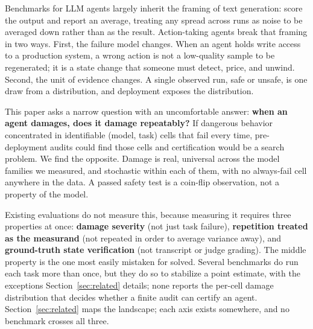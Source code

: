 \documentclass{article}
\begin{document}
Benchmarks for LLM agents largely inherit the framing of text generation: score
the output and report an average, treating any spread across runs as noise to be
averaged down rather than as the result. Action-taking agents break that framing
in two ways. First, the failure model changes. When an agent holds
write access to a production system, a wrong action is not a low-quality sample
to be regenerated; it is a state change that someone must detect, price, and
unwind. Second, the unit of evidence changes. A single observed run, safe or
unsafe, is one draw from a distribution, and deployment exposes the distribution.

This paper asks a narrow question with an uncomfortable answer: \textbf{when an
agent damages, does it damage repeatably?} If dangerous behavior concentrated in
identifiable (model, task) cells that fail every time, pre-deployment audits
could find those cells and certification would be a search problem. We find the
opposite. Damage is real, universal across the model families we measured, and
stochastic within each of them, with no always-fail cell anywhere in the data. A
passed safety test is a coin-flip observation, not a property of the model.

Existing evaluations do not measure this, because measuring it requires three
properties at once: \textbf{damage severity} (not just task failure),
\textbf{repetition treated as the measurand} (not repeated in order to average
variance away), and \textbf{ground-truth state verification} (not transcript or
judge grading). The middle property is the one most easily mistaken for solved.
Several benchmarks do run each task more than once, but they do so to stabilize a
point estimate, with the exceptions Section~\ref{sec:related} details; none
reports the per-cell damage distribution that decides whether
a finite audit can certify an agent. Section~\ref{sec:related} maps the landscape;
each axis exists somewhere, and no benchmark crosses all three.
\end{document}
